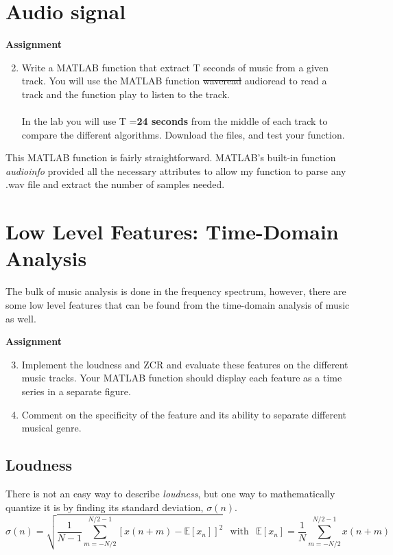 \documentclass{article} %
\begin{document}
\section{Audio signal}

\begin{framed}
\textbf{Assignment}
\begin{enumerate}
\setcounter{enumi}{1}
\item Write a MATLAB function that extract T seconds of music from a given track. You
will use the MATLAB function \sout{waveread} audioread to read a track and the function play to
listen to the track.\\\\
In the lab you will use T =\textbf{24 seconds} from the middle of each track to compare the
different algorithms. Download the files, and test your function.
\end{enumerate}
\end{framed}



This MATLAB function is fairly straightforward. MATLAB's built-in function \emph{audioinfo} provided all the necessary attributes to allow my function to parse
any .wav file and extract the number of samples needed. 

\section{Low Level Features: Time-Domain Analysis}
The bulk of music analysis is done in the frequency spectrum, however, 
there are some low level features that can be found from the time-domain
analysis of music as well. 

\begin{framed}
\textbf{Assignment}
\begin{enumerate}
\setcounter{enumi}{2}
\item Implement the loudness and ZCR and evaluate these features on the different music
tracks. Your MATLAB function should display each feature as a time series in a separate
figure.
\item Comment on the specificity of the feature and its ability to separate different musical genre. 
\end{enumerate}
\end{framed}

\subsection{Loudness}
There is not an easy way to describe \emph{loudness}, but 
one way to mathematically quantize it is by finding its
standard deviation, $\sigma(n)$. \\
\begin{equation}\label{eq:loud_std}
\sigma(n)=\sqrt{\frac{1}{N-1} \sum\limits_{m=-N/2}^{N/2-1} 
[ x(n+m)-\mathbb{E}[x_n]]^2 }\hspace{5pt} \text{ with }\hspace{5pt} 
\mathbb{E}[x_n]=\frac{1}{N}\sum\limits_{m=-N/2}^{N/2-1}x(n+m)
\end{equation}
\end{document}
